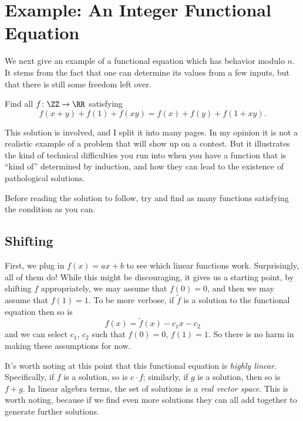 \documentclass[11pt]{scrartcl}
\begin{document}
\section{Example: An Integer Functional Equation}
We next give an example of a functional equation which has behavior modulo $n$.
It stems from the fact that one can determine its values from a few inputs,
but that there is still some freedom left over.
\begin{example}
  \label{ex:gabriel}
  Find all $f \colon \ZZ \to \RR$ satisfying
  \[f (x + y) + f (1) + f (xy) = f (x) + f (y) + f (1 + xy). \]
\end{example}

This solution is involved, and I split it into many pages.
In my opinion it is not a realistic example of a problem that will show up on a contest.
But it illustrates the kind of technical difficulties you run into
when you have a function that is ``kind of'' determined by induction,
and how they can lead to the existence of pathological solutions.

\begin{exercise}
  Before reading the solution to follow,
  try and find as many functions satisfying the condition as you can.
  \label{exer:foresight}
\end{exercise}

\subsection{Shifting}
First, we plug in $f(x) = ax+b$ to see which linear functions work.
Surprisingly, all of them do!
While this might be discouraging, it gives us a starting point,
by shifting $f$ appropriately, we may assume that $f(0) = 0$,
and then we may assume that $f(1) = 1$.
To be more verbose, if $\tilde f$ is a solution to the functional equation then so is
\[
  f(x) = \tilde f(x) - c_1 x - c_2
\]
and we can select $c_1$, $c_2$ such that $f(0) = 0$, $f(1) = 1$.
So there is no harm in making these assumptions for now.

It's worth noting at this point that this functional equation is \emph{highly linear}.
Specifically, if $f$ is a solution, so is $c \cdot f$;
similarly, if $g$ is a solution, then so is $f+g$.
In linear algebra terms, the set of solutions is a \emph{real vector space}.
This is worth noting, because if we find even more solutions they can all add
together to generate further solutions.
\end{document}

